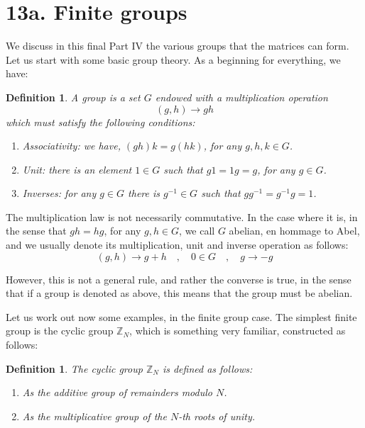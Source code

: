\documentclass[12pt]{amsbook}
\newtheorem{definition}[theorem]{Definition}
\begin{document}
\section*{13a. Finite groups}

We discuss in this final Part IV the various groups that the matrices can form. Let us start with some basic group theory. As a beginning for everything, we have:

\begin{definition}
A group is a set $G$ endowed with a multiplication operation 
$$(g,h)\to gh$$
which must satisfy the following conditions:
\begin{enumerate}
\item Associativity: we have, $(gh)k=g(hk)$, for any $g,h,k\in G$.

\item Unit: there is an element $1\in G$ such that $g1=1g=g$, for any $g\in G$.

\item Inverses: for any $g\in G$ there is $g^{-1}\in G$ such that $gg^{-1}=g^{-1}g=1$.
\end{enumerate}
\end{definition}

The multiplication law is not necessarily commutative. In the case where it is, in the sense that $gh=hg$, for any $g,h\in G$, we call $G$ abelian, en hommage to Abel, and we usually denote its multiplication, unit and inverse operation as follows:
$$(g,h)\to g+h\quad,\quad
0\in G\quad,\quad
g\to-g$$

However, this is not a general rule, and rather the converse is true, in the sense that if a group is denoted as above, this means that the group must be abelian.

\bigskip

Let us work out now some examples, in the finite group case. The simplest finite group is the cyclic group $\mathbb Z_N$, which is something very familiar, constructed as follows:


\begin{definition}
The cyclic group $\mathbb Z_N$ is defined as follows:
\begin{enumerate}
\item As the additive group of remainders modulo $N$.

\item As the multiplicative group of the $N$-th roots of unity.
\end{enumerate}
\end{definition}
\end{document}
